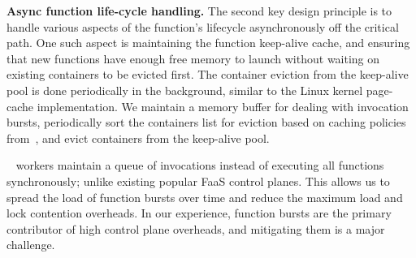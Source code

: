 




\noindent \textbf{Async function life-cycle handling.}
The second key design principle is to handle various aspects of the function's lifecycle asynchronously off the critical path. 
One such aspect is maintaining the function keep-alive cache, and ensuring that new functions have enough free memory to launch without waiting on existing containers to be evicted first.  
The container eviction from the keep-alive pool is done periodically in the background, similar to the Linux kernel page-cache implementation.
We maintain a memory buffer for dealing with invocation bursts, periodically sort the containers list for eviction based on caching policies from~\cite{faascache-asplos21}, and evict containers from the keep-alive pool.

\sysname~ workers maintain a queue of invocations instead of executing all functions synchronously; unlike existing popular FaaS control planes.
This allows us to spread the load of function bursts over time and reduce the maximum load and lock contention overheads.
In our experience, function bursts are the primary contributor of high control plane overheads, and mitigating them is a major challenge. 


